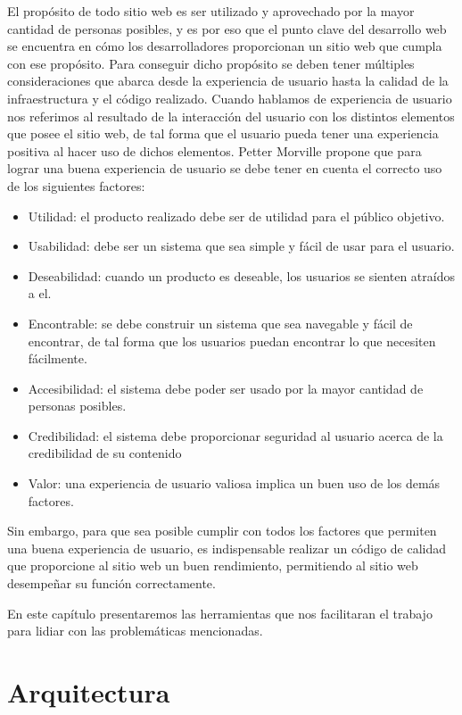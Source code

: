 El propósito de todo sitio web es ser utilizado y aprovechado por la mayor cantidad de personas posibles, y es por eso que el punto clave del desarrollo web se encuentra en cómo los desarrolladores proporcionan un sitio web que cumpla con ese propósito. Para conseguir dicho propósito se deben tener múltiples consideraciones que abarca desde la experiencia de usuario hasta la calidad de la infraestructura y el código realizado. Cuando hablamos de experiencia de usuario nos referimos al resultado de la interacción del usuario con los distintos elementos que posee el sitio web, de tal forma que el usuario pueda tener una experiencia positiva al hacer uso de dichos elementos. Petter Morville \cite{UXFactors} propone que para lograr una buena experiencia de usuario se debe tener en cuenta el correcto uso de los siguientes factores: 

\begin{itemize}
    \item Utilidad: el producto realizado debe ser de utilidad para el público objetivo.
    \item Usabilidad: debe ser un sistema que sea simple y fácil de usar para el usuario.
    \item Deseabilidad: cuando un producto es deseable, los usuarios se sienten atraídos a el.
    \item Encontrable: se debe construir un sistema que sea navegable y fácil de encontrar, de tal forma que los usuarios puedan encontrar lo que necesiten fácilmente.
    \item Accesibilidad: el sistema debe poder ser usado por la mayor cantidad de personas posibles.
    \item Credibilidad: el sistema debe proporcionar seguridad al usuario acerca de la credibilidad de su contenido
    \item Valor: una experiencia de usuario valiosa implica un buen uso de los demás factores.
\end{itemize}

Sin embargo, para que sea posible cumplir con todos los factores que permiten una buena experiencia de usuario,
es indispensable realizar un código de calidad que proporcione al sitio web un buen rendimiento, permitiendo al sitio web
desempeñar su función correctamente.

En este capítulo presentaremos las herramientas que nos facilitaran el trabajo para lidiar con las problemáticas mencionadas.

\section{Arquitectura}

